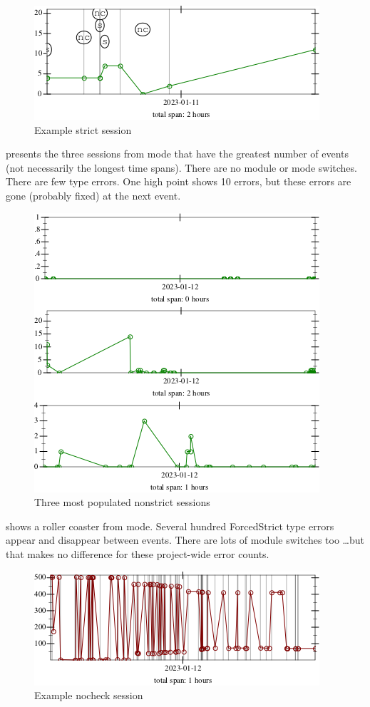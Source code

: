\documentclass[
  acmsmall,
  review,
  anonymous,
]{acmart}
\begin{document}
\begin{figure}[t]
  \includegraphics[width=0.7\columnwidth]{img/example-session-strict.pdf}
  \caption{Example strict session}
  \label{f:ex-session-strict}
\end{figure}

 presents the three sessions from \mnonstrict{} mode
that have the greatest number of events (not necessarily the longest time spans).
There are no module or mode switches.
There are few type errors.
One high point shows 10 errors, but these errors are gone (probably fixed) at
the next event.

\begin{figure}[t]
  \includegraphics[width=0.7\columnwidth]{img/example-session-nonstrict.pdf}
  \caption{Three most populated nonstrict sessions}
  \label{f:ex-session-nonstrict}
\end{figure}

 shows a roller coaster from \mnocheck{} mode.
Several hundred ForcedStrict type errors appear and disappear between events.
There are lots of module switches too \ldots but that makes no difference
for these project-wide error counts.

\begin{figure}[t]
  \includegraphics[width=0.7\columnwidth]{img/example-session-nocheck.pdf}
  \caption{Example nocheck session}
  \label{f:ex-session-nocheck}
\end{figure}
\end{document}
